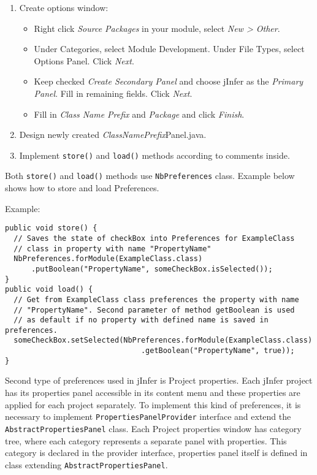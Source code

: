 \documentclass[a4paper,10pt,oneside]{article}
\begin{document}
\begin{enumerate}
 \item Create options window:
  \begin{itemize}
   \item Right click \textit{Source Packages} in your module,
                            select \textit{New > Other}.
   \item Under Categories, select Module Development. Under
                            File Types, select Options Panel. Click \textit{Next}.
   \item Keep checked \textit{Create Secondary Panel} and choose
                            jInfer as the \textit{Primary Panel}. Fill in remaining
                            fields. Click \textit{Next}.
   
   \item Fill in \textit{Class Name Prefix} and \textit{Package}
                            and click \textit{Finish}.
  \end{itemize}
 
 \item Design newly created \textit{ClassNamePrefix}Panel.java.
 \item Implement \texttt{store()} and \texttt{load()} methods according to comments inside.
\end{enumerate}
\par 
  Both \texttt{store()} and \texttt{load()} methods use
  \texttt{NbPreferences}
  class. Example below shows how to store and load Preferences.

Example:
\begin{verbatim}
public void store() {
  // Saves the state of checkBox into Preferences for ExampleClass
  // class in property with name "PropertyName"
  NbPreferences.forModule(ExampleClass.class)
      .putBoolean("PropertyName", someCheckBox.isSelected());
}
public void load() {
  // Get from ExampleClass class preferences the property with name
  // "PropertyName". Second parameter of method getBoolean is used
  // as default if no property with defined name is saved in preferences.
  someCheckBox.setSelected(NbPreferences.forModule(ExampleClass.class)
                               .getBoolean("PropertyName", true));
}
\end{verbatim}
\par 
  Second type of preferences used in jInfer is Project properties. Each jInfer
  project has its properties panel accessible in its content menu and
  these properties are applied for each project separately. To implement this
  kind of preferences, it is necessary to implement
  \texttt{PropertiesPanelProvider}
  interface and extend the
  \texttt{AbstractPropertiesPanel}
  class. Each Project properties window has category tree, where each category
  represents a separate panel with properties. This category is declared in the
  provider interface, properties panel itself is defined in class extending
  \texttt{AbstractPropertiesPanel}.
\end{document}
